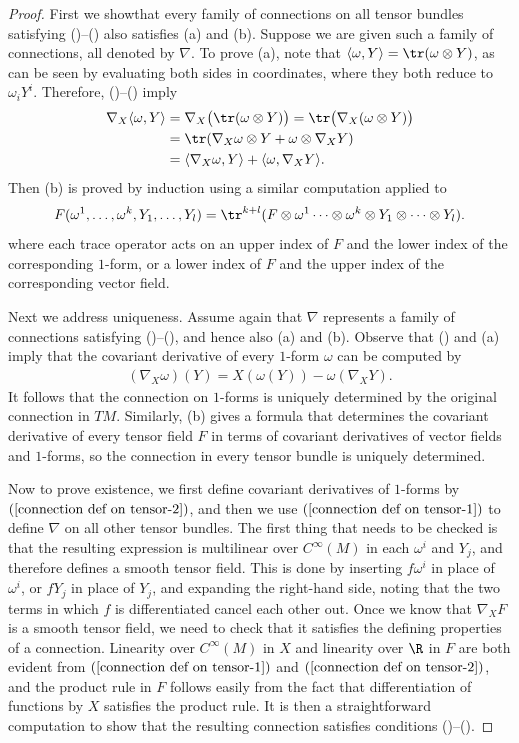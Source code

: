 \begin{proof}
First we showthat every family of connections on all tensor bundles satisfying ()--() 
also satisfies (a) and (b). Suppose we are given such a family of connections, all denoted 
by $\nabla$. To prove (a), note that $\langle\omega,Y\rangle=\tr(\omega\otimes Y)$, as can 
be seen by evaluating both sides in coordinates, where they both reduce to $\omega_iY^i$. 
Therefore, ()--() imply
\begin{align*}
\nabla_X\langle\omega,Y\rangle&=\nabla_X\big(\tr(\omega\otimes Y)\big)=\tr\big(\nabla_X(\omega\otimes Y)\big)\\
&=\tr(\nabla_X\omega\otimes Y+\omega\otimes\nabla_XY)\\
&=\langle\nabla_X\omega,Y\rangle+\langle\omega,\nabla_XY\rangle.
\end{align*}
Then (b) is proved by induction using a similar computation applied to
\[F(\omega^1,\dots,\omega^k,Y_1,\dots,Y_l)=\tr^{k+l}(F\otimes\omega^1\cdots\otimes\omega^k\otimes Y_1\otimes\cdots\otimes Y_l).\]
where each trace operator acts on an upper index of $F$ and the lower index of the corresponding 
$1$-form, or a lower index of $F$ and the upper index of the corresponding vector field.\par
Next we address uniqueness. Assume again that $\nabla$ represents a family of connections satisfying 
()–(), and hence also (a) and (b). Observe that () and (a) 
imply that the covariant derivative of every $1$-form $\omega$ can be computed by
\begin{align}\label{connection def on tensor-2}
(\nabla_X\omega)(Y)=X(\omega(Y))-\omega(\nabla_XY).
\end{align}
It follows that the connection on $1$-forms is uniquely determined by the original connection 
in $TM$. Similarly, (b) gives a formula that determines the covariant derivative of every 
tensor field $F$ in terms of covariant derivatives of vector fields and $1$-forms, so the 
connection in every tensor bundle is uniquely determined.\par
Now to prove existence, we first define covariant derivatives of $1$-forms by $(\ref{connection def on tensor-2})$, 
and then we use $(\ref{connection def on tensor-1})$ to define $\nabla$ on all other tensor bundles. 
The first thing that needs to be checked is that the resulting expression is multilinear 
over $C^{\infty}(M)$ in each $\omega^i$ and $Y_j$, and therefore defines a smooth tensor 
field. This is done by inserting $f\omega^i$ in place of $\omega^i$, or $fY_j$ in place of $Y_j$, 
and expanding the right-hand side, noting that the two terms in which $f$ is differentiated 
cancel each other out. Once we know that $\nabla_XF$ is a smooth tensor field, we need to 
check that it satisfies the defining properties of a connection. Linearity over $C^{\infty}(M)$ 
in $X$ and linearity over $\R$ in $F$ are both evident from $(\ref{connection def on tensor-1})$ and 
$(\ref{connection def on tensor-2})$, and the product rule in $F$ follows easily from the fact that 
differentiation of functions by $X$ satisfies the product rule. It is then a straightforward computation 
to show that the resulting connection satisfies conditions ()--().
\end{proof}
